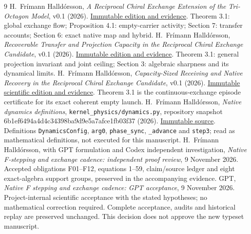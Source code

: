 \clearpage
\begin{thebibliography}{9}
H.~Fr\'imann Halld\'orsson,
\emph{A Reciprocal Chiral Exchange Extension of the Tri-Octagon Model},
v0.1 (2026).
\href{https://github.com/pzychozen/trioctagon-physics/tree/273b1a6faaab19ea58748d00576439166eeef9ab/papers/RECIPROCAL_CHIRAL_EXCHANGE/publication/v0.1}{Immutable edition and evidence}.
Theorem 3.1: global exchange flow; Proposition 4.1: empty-carrier activity; Section 7: transfer accounts; Section 6: exact native map and hybrid.
H.~Fr\'imann Halld\'orsson,
\emph{Recoverable Transfer and Projection Capacity in the Reciprocal Chiral Exchange Candidate},
v0.1 (2026).
\href{https://github.com/pzychozen/trioctagon-physics/tree/54c0f6c419fa681e2c1e74a5ad2bb46df787bb93/papers/RECOVERABLE_TRANSFER_AND_PROJECTION_CAPACITY/publication/v0.1}{Immutable edition and evidence}.
Theorem 3.1: general projection invariant and joint ceiling; Section 3: algebraic sharpness and its dynamical limits.
H.~Fr\'imann Halld\'orsson,
\emph{Capacity-Sized Receiving and Native Recovery in the Reciprocal Chiral Exchange Candidate},
v0.1 (2026).
\href{https://github.com/pzychozen/trioctagon-physics/tree/34bf6c6e4e18adcc177ac700359fda16cf4d772d/papers/NATIVE_CAPACITY_RECEIVING_RECOVERY/publication/v0.1}{Immutable scientific edition and evidence}.
Theorem 3.1 is the continuous-exchange episode certificate for its exact coherent empty launch.
H.~Fr\'imann Halld\'orsson,
\emph{Native dynamics definitions}, \texttt{kernel\_physics/dynamics.py},
repository snapshot 6b1ef6494a4d4c34398ba9d9e5a7afce1fb03f37 (2026).
\href{https://github.com/pzychozen/trioctagon-physics/blob/6b1ef6494a4d4c34398ba9d9e5a7afce1fb03f37/kernel_physics/dynamics.py}{Immutable source}.
Definitions \texttt{DynamicsConfig}, \texttt{arg0}, \texttt{phase\_sync}, \texttt{\_advance} and \texttt{step3}; read as mathematical definitions, not executed for this manuscript.
H.~Fr\'imann Halld\'orsson, with GPT formulation and Codex independent investigation,
\emph{Native F-stepping and exchange cadence: independent proof review},
9 November 2026. Accepted obligations F01--F12, equations 1--59, claim/source ledger and eight exact-algebra support groups, preserved in the accompanying evidence.
GPT, \emph{Native F stepping and exchange cadence: GPT acceptance},
9 November 2026. Project-internal scientific acceptance with the stated hypotheses; no mathematical correction required. Complete acceptance, audits and historical replay are preserved unchanged. This decision does not approve the new typeset manuscript.
\end{thebibliography}
